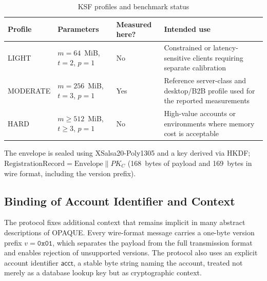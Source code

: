 \documentclass[preprint,12pt]{elsarticle}
\newcommand{\acct}{\mathsf{acct}}
\theoremstyle{remark}
\begin{document}
\begin{table}[htbp]
\caption{KSF profiles and benchmark status}
\label{tab:ksf-profiles}
\centering\small
\begin{tabularx}{\textwidth}{@{}L{2.4cm}L{3.3cm}L{3.0cm}X@{}}
\toprule
Profile & Parameters & Measured here? & Intended use \\
\midrule
LIGHT & $m=64$~MiB, $t=2$, $p=1$ & No & Constrained or latency-sensitive clients requiring separate calibration \\
MODERATE & $m=256$~MiB, $t=3$, $p=1$ & Yes & Reference server-class and desktop/B2B profile used for the reported measurements \\
HARD & $m\geq512$~MiB, $t\geq3$, $p=1$ & No & High-value accounts or environments where memory cost is acceptable \\
\bottomrule
\end{tabularx}
\end{table}
The envelope is sealed using XSalsa20-Poly1305 and a key derived via
HKDF;
$\mathrm{RegistrationRecord} = \mathrm{Envelope} \| PK_C$
(168~bytes of payload and 169~bytes in wire format, including the
version prefix).

\subsection{Binding of Account Identifier and Context}

The protocol fixes additional context that remains implicit in many
abstract descriptions of OPAQUE. Every wire-format message carries a
one-byte version prefix $v = \mathtt{0x01}$, which separates the
payload from the full transmission format and enables rejection of
unsupported versions. The protocol also uses an explicit account
identifier $\acct$, a stable byte string naming the account, treated not
merely as a database lookup key but as cryptographic context.
\end{document}
